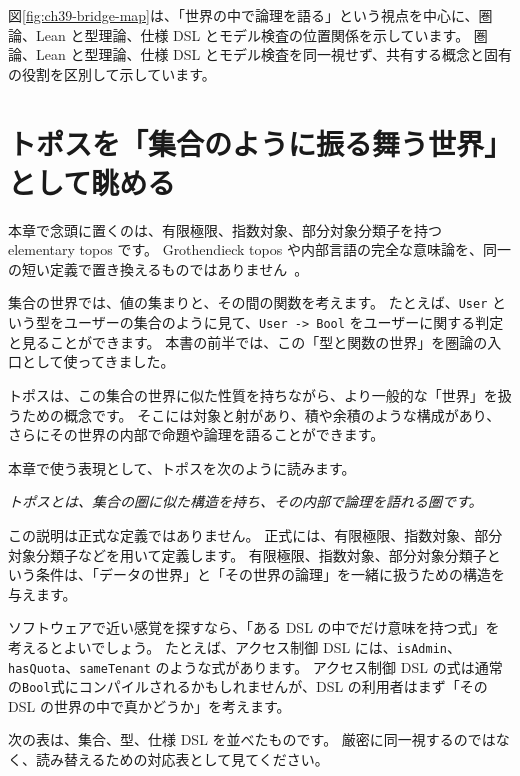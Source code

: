 
図\ref{fig:ch39-bridge-map}は、「世界の中で論理を語る」という視点を中心に、圏論、Lean と型理論、仕様 DSL とモデル検査の位置関係を示しています。
圏論、Lean と型理論、仕様 DSL とモデル検査を同一視せず、共有する概念と固有の役割を区別して示しています。

\section{トポスを「集合のように振る舞う世界」として眺める}

本章で念頭に置くのは、有限極限、指数対象、部分対象分類子を持つ elementary topos です。
Grothendieck topos や内部言語の完全な意味論を、同一の短い定義で置き換えるものではありません~\cite{maclane-moerdijk-sheaves}。

集合の世界では、値の集まりと、その間の関数を考えます。
たとえば、\texttt{User} という型をユーザーの集合のように見て、\texttt{User -> Bool} をユーザーに関する判定と見ることができます。
本書の前半では、この「型と関数の世界」を圏論の入口として使ってきました。

トポスは、この集合の世界に似た性質を持ちながら、より一般的な「世界」を扱うための概念です。
そこには対象と射があり、積や余積のような構成があり、さらにその世界の内部で命題や論理を語ることができます。

本章で使う表現として、トポスを次のように読みます。

\medskip

\emph{トポスとは、集合の圏に似た構造を持ち、その内部で論理を語れる圏です。}

\medskip

この説明は正式な定義ではありません。
正式には、有限極限、指数対象、部分対象分類子などを用いて定義します。
有限極限、指数対象、部分対象分類子という条件は、「データの世界」と「その世界の論理」を一緒に扱うための構造を与えます。

ソフトウェアで近い感覚を探すなら、「ある DSL の中でだけ意味を持つ式」を考えるとよいでしょう。
たとえば、アクセス制御 DSL には、\texttt{isAdmin}、\texttt{hasQuota}、\texttt{sameTenant} のような式があります。
アクセス制御 DSL の式は通常の\texttt{Bool}式にコンパイルされるかもしれませんが、DSL の利用者はまず「その DSL の世界の中で真かどうか」を考えます。

次の表は、集合、型、仕様 DSL を並べたものです。
厳密に同一視するのではなく、読み替えるための対応表として見てください。

